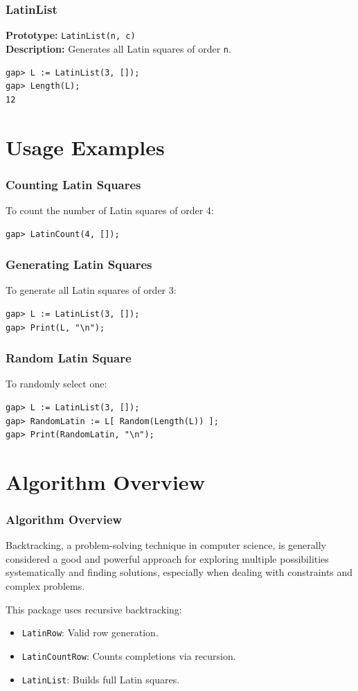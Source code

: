 \documentclass{beamer}
\begin{document}
\begin{frame}[fragile]
\frametitle{LatinList}
\textbf{Prototype:} \texttt{LatinList(n, c)}\\
\textbf{Description:} Generates all Latin squares of order \texttt{n}.
\begin{lstlisting}
gap> L := LatinList(3, []);
gap> Length(L);
12
\end{lstlisting}
\end{frame}

\section{Usage Examples}
\begin{frame}[fragile]
\frametitle{Counting Latin Squares}
To count the number of Latin squares of order 4:
\begin{lstlisting}
gap> LatinCount(4, []);
\end{lstlisting}
\end{frame}

\begin{frame}[fragile]
\frametitle{Generating Latin Squares}
To generate all Latin squares of order 3:
\begin{lstlisting}
gap> L := LatinList(3, []);
gap> Print(L, "\n");
\end{lstlisting}
\end{frame}

\begin{frame}[fragile]
\frametitle{Random Latin Square}
To randomly select one:
\begin{lstlisting}
gap> L := LatinList(3, []);
gap> RandomLatin := L[ Random(Length(L)) ];
gap> Print(RandomLatin, "\n");
\end{lstlisting}
\end{frame}

\section{Algorithm Overview}
\begin{frame}
\frametitle{Algorithm Overview}

Backtracking, a problem-solving technique in computer science, is generally considered a good and powerful approach for exploring multiple possibilities systematically and finding solutions, especially when dealing with constraints and complex problems. 

This package uses recursive backtracking:
\begin{itemize}
  \item \texttt{LatinRow}: Valid row generation.
  \item \texttt{LatinCountRow}: Counts completions via recursion.
  \item \texttt{LatinList}: Builds full Latin squares.
\end{itemize}
\end{frame}
\end{document}
